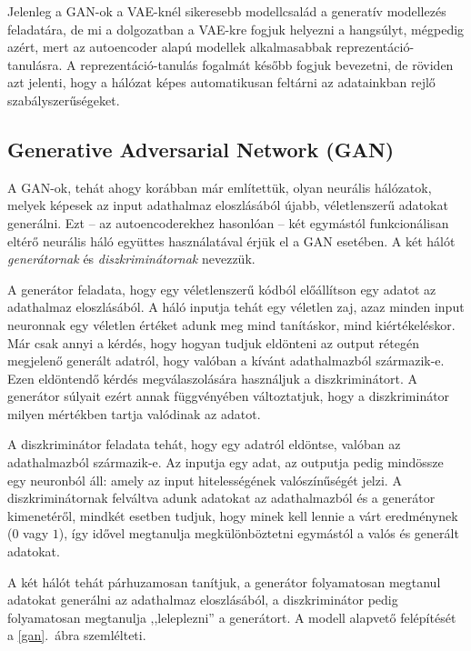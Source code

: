 Jelenleg a GAN-ok a VAE-knél sikeresebb modellcsalád a generatív modellezés feladatára, de mi a dolgozatban a VAE-kre fogjuk helyezni a hangsúlyt, mégpedig azért, mert az autoencoder alapú modellek alkalmasabbak reprezentáció-tanulásra. A reprezentáció-tanulás fogalmát később fogjuk bevezetni, de röviden azt jelenti, hogy a hálózat képes automatikusan feltárni az adatainkban rejlő szabályszerűségeket.

\subsection{Generative Adversarial Network (GAN)}

A GAN-ok, tehát ahogy korábban már említettük, olyan neurális hálózatok, melyek képesek az input adathalmaz eloszlásából újabb, véletlenszerű adatokat generálni. Ezt -- az autoencoderekhez hasonlóan -- két egymástól funkcionálisan eltérő neurális háló együttes használatával érjük el a GAN esetében. A két hálót \textit{generátornak} és \textit{diszkriminátornak} nevezzük.

A generátor feladata, hogy egy véletlenszerű kódból előállítson egy adatot az adathalmaz eloszlásából. A háló inputja tehát egy véletlen zaj, azaz minden input neuronnak egy véletlen értéket adunk meg mind tanításkor, mind kiértékeléskor. Már csak annyi a kérdés, hogy hogyan tudjuk eldönteni az output rétegén megjelenő generált adatról, hogy valóban a kívánt adathalmazból származik-e. Ezen eldöntendő kérdés megválaszolására használjuk a diszkriminátort. A generátor súlyait ezért annak függvényében változtatjuk, hogy a diszkriminátor milyen mértékben tartja valódinak az adatot.

A diszkriminátor feladata tehát, hogy egy adatról eldöntse, valóban az adathalmazból származik-e. Az inputja egy adat, az outputja pedig mindössze egy neuronból áll: amely az input hitelességének valószínűségét jelzi. A diszkriminátornak felváltva adunk adatokat az adathalmazból és a generátor kimenetéről, mindkét esetben tudjuk, hogy minek kell lennie a várt eredménynek ($0$ vagy $1$), így idővel megtanulja megkülönböztetni egymástól a valós és generált adatokat. 

A két hálót tehát párhuzamosan tanítjuk, a generátor folyamatosan megtanul adatokat generálni az adathalmaz eloszlásából, a diszkriminátor pedig folyamatosan megtanulja ,,leleplezni'' a generátort. A modell alapvető felépítését a \ref{gan}.~ábra szemlélteti.

